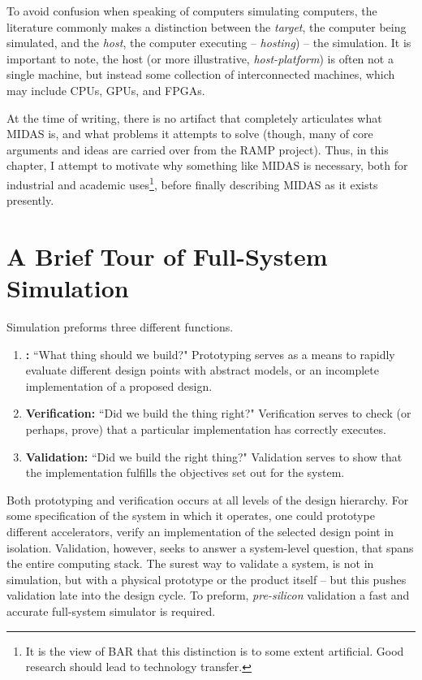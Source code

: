 To avoid confusion when speaking of computers simulating computers, the
literature commonly makes a distinction between the \emph{target}, the computer
being simulated, and the \emph{host}, the computer executing -- \emph{hosting})
-- the simulation. It is important to note, the host (or more illustrative,
\emph{host-platform}) is often not a single machine, but instead some
collection of interconnected machines, which may include CPUs, GPUs, and FPGAs.

At the time of writing, there is no artifact that completely articulates what
MIDAS is, and what problems it attempts to solve (though, many of core
arguments and ideas are carried over from the RAMP project). Thus, in this
chapter, I attempt to motivate why something like MIDAS is necessary, both for
industrial and academic uses\footnote{It is the view of BAR that this
distinction is to some extent artificial. Good research should lead to
technology transfer.}, before finally describing MIDAS as it exists presently.

\section{A Brief Tour of Full-System Simulation}

Simulation preforms three different functions.

\begin{enumerate}

    \item \textbf{:} ``What thing should we build?" Prototyping
        serves as a means to rapidly evaluate different design points with
        abstract models, or an incomplete implementation of a proposed design.

    \item \textbf{Verification:} ``Did we build the thing right?" Verification
        serves to check (or perhaps, prove) that a particular implementation
        has correctly executes.

    \item \textbf{Validation:} ``Did we build the right thing?" Validation
        serves to show that the implementation fulfills the objectives set out
        for the system.

\end{enumerate}

Both prototyping and verification occurs at all levels of the design hierarchy.
For some specification of the system in which it operates, one could prototype
different accelerators, verify an implementation of the selected design point
in isolation. Validation, however, seeks to answer a system-level question,
that spans the entire computing stack.  The surest way to validate a system, is
not in simulation, but with a physical prototype or the product itself -- but
this pushes validation late into the design cycle. To preform,
\emph{pre-silicon} validation a fast and accurate full-system simulator is
required.

